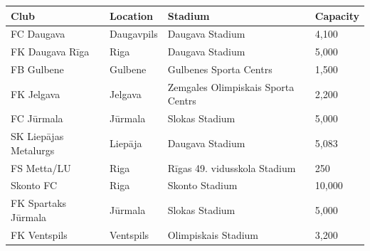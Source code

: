 \documentclass{article}
\begin{document}
\begin{tabular}{llll}
\toprule
Club & Location & Stadium & Capacity \\
\midrule
FC Daugava & Daugavpils & Daugava Stadium & 4,100 \\
FK Daugava Rīga & Riga & Daugava Stadium & 5,000 \\
FB Gulbene & Gulbene & Gulbenes Sporta Centrs & 1,500 \\
FK Jelgava & Jelgava & Zemgales Olimpiskais Sporta Centrs & 2,200 \\
FC Jūrmala & Jūrmala & Slokas Stadium & 5,000 \\
SK Liepājas Metalurgs & Liepāja & Daugava Stadium & 5,083 \\
FS Metta/LU & Riga & Rīgas 49. vidusskola Stadium & 250 \\
Skonto FC & Riga & Skonto Stadium & 10,000 \\
FK Spartaks Jūrmala & Jūrmala & Slokas Stadium & 5,000 \\
FK Ventspils & Ventspils & Olimpiskais Stadium & 3,200 \\
\bottomrule
\end{tabular}
\end{document}
